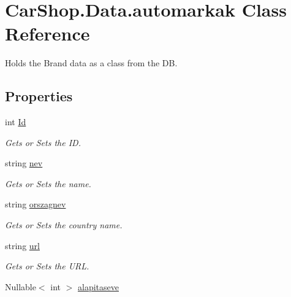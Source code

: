 \hypertarget{class_car_shop_1_1_data_1_1automarkak}{}\section{Car\+Shop.\+Data.\+automarkak Class Reference}
\label{class_car_shop_1_1_data_1_1automarkak}


Holds the Brand data as a class from the DB.  


\subsection*{Properties}
\begin{DoxyCompactItemize}
\item 
int \mbox{\hyperlink{class_car_shop_1_1_data_1_1automarkak_a14c416508ac4b5c45851a22379a3187f}{Id}}
\begin{DoxyCompactList}\small\item\em Gets or Sets the ID. \end{DoxyCompactList}\item 
string \mbox{\hyperlink{class_car_shop_1_1_data_1_1automarkak_ade362cb48f84aeb1819cf04bdc55ce05}{nev}}
\begin{DoxyCompactList}\small\item\em Gets or Sets the name. \end{DoxyCompactList}\item 
string \mbox{\hyperlink{class_car_shop_1_1_data_1_1automarkak_a24a9eef425164f6c2cdeac661558ff06}{orszagnev}}
\begin{DoxyCompactList}\small\item\em Gets or Sets the country name. \end{DoxyCompactList}\item 
string \mbox{\hyperlink{class_car_shop_1_1_data_1_1automarkak_a532e5b0b45c5f717ad1be50ce28e6af6}{url}}
\begin{DoxyCompactList}\small\item\em Gets or Sets the U\+RL. \end{DoxyCompactList}\item 
Nullable$<$ int $>$ \mbox{\hyperlink{class_car_shop_1_1_data_1_1automarkak_a2ace68ab067bd8ddc272037e27aae27b}{alapitaseve}}

\end{DoxyCompactItemize}
